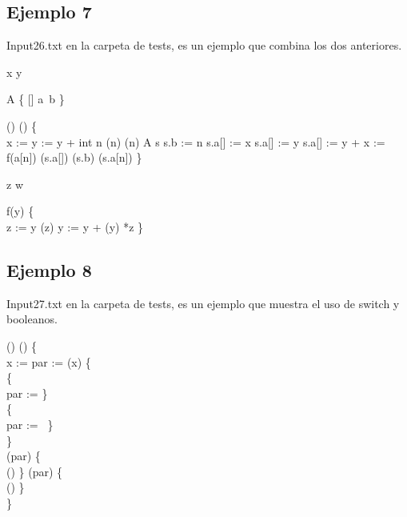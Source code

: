 \newpage


\subsection{Ejemplo 7}
Input26.txt en la carpeta de tests, es un ejemplo que combina los dos anteriores.

\begin{algorithm}

	\Integer{} x  \;
	\Integer{} y  \;
	
	 A \{
		\quad {}[] a\,
		\quad {} b\;
	\} \;
	
	\Void() () \{ \\
	\quad x :=  \;
	\quad y := y + \;
	\quad int n\;
	\quad {}(n)\;
	\quad {}(n)\;
	\quad {} A s\;
	\quad s.b := n\;
	\quad s.a[] := x\;
	\quad s.a[] := y\;
	\quad s.a[] := y + \;
	\quad x := f(a[n])\;
	\quad {}(s.a[])\;
	\quad {}(s.b)\;
	\quad {}(s.a[n])\;
	\}\;

 	\Integer{} z \;
	\Integer{} w \;
	
	 f(y) \{ \\
	\quad z := y \;
	\quad {}(z) \;
	\quad y := y +  \;
	\quad {}(y) \;
	\quad {} *z \;
	\}\;
	
\end{algorithm}

\newpage

\subsection{Ejemplo 8}
Input27.txt en la carpeta de tests, es un ejemplo que muestra el uso de switch y booleanos.

\begin{algorithm}

	
	\Void() () \{ \\
	\quad {} x :=  \;
	\quad {} par :=  \;
	\quad {}(x) \{\\
	\quad \quad {}  \{ \\
	\quad \quad \quad par :=  \;
	\quad \} \\
	\quad \quad {}  \{ \\
	\quad \quad \quad par := \,
	\quad \} \\
	\quad \} \\
	\quad {}(par) \{ \\
	\quad \quad {}()\;
	\quad \} (par) \{ \\
	\quad \quad {}()\;
	\quad \} \\
	\}\;
	
\end{algorithm}

